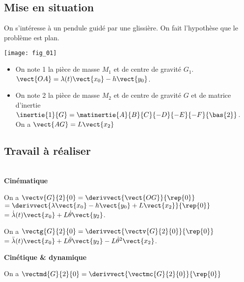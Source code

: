 \ifprof
\else
\begin{multicols}{2}
\fi

\subsection*{Mise en situation}
On s'intéresse à un pendule guidé par une glissière. On fait l'hypothèse que le problème est plan. 

\begin{center}
\texttt{[image: fig\_01]}
\end{center}
\begin{itemize}
\item On note 1 la pièce de masse $M_1$ et de centre de gravité $G_1$. $\vect{OA}=\lambda(t)\vect{x_0}-h\vect{y_0}$.
\item On note 2 la pièce de masse $M_2$ et de centre de gravité $G$ et de matrice d'inertie $\inertie{1}{G}= \matinertie{A}{B}{C}{-D}{-E}{-F}{\bas{2}}$. On a $\vect{AG}=L\vect{x_2}$
\end{itemize}

\subsection*{Travail à réaliser}

\ifprof
\begin{corrige}
~\\

\textbf{Cinématique}

On a $\vectv{G}{2}{0}=\derivvect{\vect{OG}}{\rep{0}} $ 
$=\derivvect{\lambda\vect{x_0}-h\vect{y_0}+L\vect{x_2}}{\rep{0}}$ 
$=\dot{\lambda}(t)\vect{x_0}+L\dot{\theta}\vect{y_2}$.



On a $\vectg{G}{2}{0}=\derivvect{\vectv{G}{2}{0}}{\rep{0}} $ 
$=\ddot{\lambda}(t)\vect{x_0}+L\ddot{\theta}\vect{y_2}-L\dot{\theta}^2\vect{x_2}$.

\textbf{Cinétique \& dynamique}


On a $\vectmd{G}{2}{0} = \derivvect{\vectmc{G}{2}{0}}{\rep{0}} $
\end{corrige}
\else
\fi



\ifprof
\begin{corrige}
\end{corrige}
\else
\fi



\ifprof
\else
\end{multicols}
\fi

